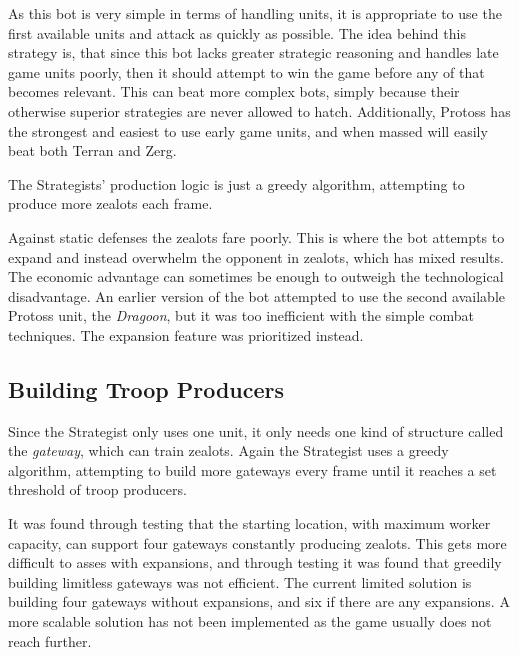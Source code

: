 	As this bot is very simple in terms of handling units, it is appropriate to use the first available units and attack as quickly as possible. The idea behind this strategy is, that since this bot lacks greater strategic reasoning and handles late game units poorly, then it should attempt to win the game before any of that becomes relevant. This can beat more complex bots, simply because their otherwise superior strategies are never allowed to hatch. Additionally, Protoss has the strongest and easiest to use early game units, and when massed will easily beat both Terran and Zerg.

	The Strategists' production logic is just a greedy algorithm, attempting to produce more zealots each frame.

	Against static defenses the zealots fare poorly. This is where the bot attempts to expand and instead overwhelm the opponent in zealots, which has mixed results. The economic advantage can sometimes be enough to outweigh the technological disadvantage. An earlier version of the bot attempted to use the second available Protoss unit, the \emph{Dragoon}, but it was too inefficient with the simple combat techniques. The expansion feature was prioritized instead.
	
	\subsection*{Building Troop Producers}
	Since the Strategist only uses one unit, it only needs one kind of structure called the \emph{gateway}, which can train zealots. Again the Strategist uses a greedy algorithm, attempting to build more gateways every frame until it reaches a set threshold of troop producers.
	
	It was found through testing that the starting location, with maximum worker capacity, can support four gateways constantly producing zealots. This gets more difficult to asses with expansions, and through testing it was found that greedily building limitless gateways was not efficient. The current limited solution is building four gateways without expansions, and six if there are any expansions. A more scalable solution has not been implemented as the game usually does not reach further.
